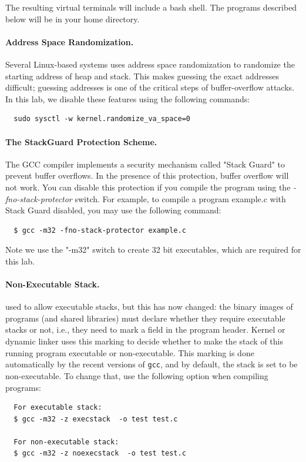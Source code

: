 The resulting virtual terminals will include a 
bash shell.  The programs
described below will be in your home directory.

\paragraph{Address Space Randomization.}
Several Linux-based systems uses address space
randomization to randomize the starting address of heap and
stack. This makes guessing the exact addresses difficult; guessing
addresses is one of the critical steps of buffer-overflow attacks.  In
this lab, we disable these features using the following commands:

\begin{verbatim}
  sudo sysctl -w kernel.randomize_va_space=0
\end{verbatim}


\paragraph{The StackGuard Protection Scheme.}
The GCC compiler implements a security mechanism called
"Stack Guard" to prevent buffer overflows. In the presence of this
protection, buffer overflow will not work. You can disable this
protection if you compile the program using the 
\emph{-fno-stack-protector} switch. For example, to compile a program
example.c with Stack Guard disabled, you may use the following command:
\begin{verbatim}
  $ gcc -m32 -fno-stack-protector example.c
\end{verbatim}
\noindent Note we use the "-m32" switch to create 32 bit executables, which
are required for this lab.

\paragraph{Non-Executable Stack.} \ubuntu used to allow executable stacks, but
this has now changed: the binary images of programs (and shared libraries) 
must declare whether they require executable stacks or not, i.e., they need to 
mark a field in the program header. Kernel or dynamic linker uses this marking
to decide whether to make the stack of this running program executable or 
non-executable. This marking is done automatically by the 
recent versions of {\tt gcc}, and by default, the stack is set to 
be non-executable.  To change that, use the following option when compiling
programs:
\begin{verbatim}
  For executable stack:
  $ gcc -m32 -z execstack  -o test test.c

  For non-executable stack:
  $ gcc -m32 -z noexecstack  -o test test.c
\end{verbatim}




